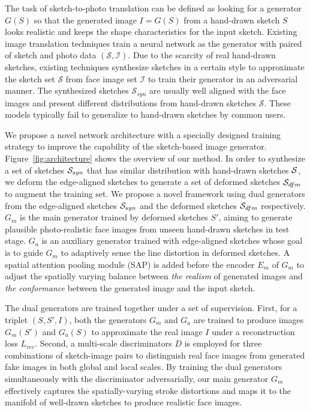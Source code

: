 % 

The task of sketch-to-photo translation can be defined as looking for a generator $G(S)$ so that the generated image $I=G(S)$ from a hand-drawn sketch $S$ looks realistic and keeps the shape characteristics for the input sketch.
%
Existing image translation techniques train a neural network as the generator with paired of sketch and photo data $(\mathcal{S}, \mathcal{I})$.
%
Due to the scarcity of real hand-drawn sketches, existing techniques synthesize sketches in a certain style to approximate the sketch set $\mathcal{S}$ from face image set $\mathcal{I}$ to train their generator in an adversarial manner.
The synthesized sketches $\mathcal{S}_{syn}$ are usually well aligned with the face images and present different distributions from hand-drawn sketches $\mathcal{S}$.
These models typically fail to generalize to hand-drawn sketches by common users. 
%


We propose a novel network architecture with a specially designed training strategy to improve the capability of the sketch-based image generator.
%
Figure~\ref{fig:architecture} shows the overview of our method.
%
In order to synthesize a set of sketches $\mathcal{S}_{syn}$ that has similar distribution with hand-drawn sketches $\mathcal{S}$, we deform the edge-aligned sketches to generate a set of deformed sketches $\mathcal{S}_{dfm}$ to augment the training set.
We propose a novel framework using dual generators from the edge-aligned sketches $\mathcal{S}_{syn}$ and the deformed sketches $\mathcal{S}_{dfm}$ respectively.
%
$G_m$ is the main generator trained by deformed sketches $S'$, aiming to generate plausible photo-realistic face images from unseen hand-drawn sketches in test stage. 
$G_a$ is an auxiliary generator trained with edge-aligned sketches whose goal is to guide $G_m$ to adaptively sense the line distortion in deformed sketches.
%
A spatial attention pooling module (SAP) is added before the encoder $E_m$ of $G_m$ to adjust the spatially varying balance between \textit{the realism} of generated images and \textit{the conformance} between the generated image and the input sketch. 
%

The dual generators are trained together under a set of supervision. 
First, for a triplet $(S,S',I)$, both the generators $G_m$ and $G_a$ are trained to produce images $G_m(S')$ and $G_a(S)$ to approximate the real image $I$ under a reconstruction loss $L_{rec}$. 
Second, a multi-scale discriminators $D$ is employed for three combinations of sketch-image pairs to distinguish real face images from generated fake images in both global and local scales. 
By training the dual generators simultaneously with the discriminator adversarially, our main generator $G_m$ effectively captures the spatially-varying stroke distortions and maps it to the manifold of well-drawn sketches to produce realistic face images.


